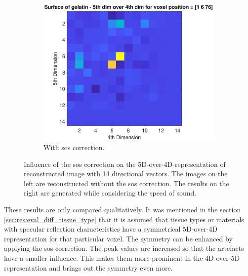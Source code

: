 \begin{figure}[H]
\begin{subfigure}[b]{0.47\textwidth}
         \label{leer}
     \end{subfigure}
          \hfill
     \begin{subfigure}[b]{0.47\textwidth}
         \centering
         \includegraphics[width=1.02\textwidth]{Graphics/Results/14_vecs_sos_vs_noSos/5thdim_over4D_with_sos_skin.eps}
         \caption{With \ac{sos} correction.}
         \label{leer}
     \end{subfigure}
        \caption{Influence of the \ac{sos} correction on the 5D-over-4D-representation of reconstructed image with 14 directional vectors. The images on the left are reconstructed without the \ac{sos} correction. The results on the right are generated while considering the speed of sound.}
        \label{fig:influence_sos_1}
\end{figure}

These results are only compared qualitatively. It was mentioned in the section \ref{sec:res:eval_diff_tissue_type} that it is assumed that tissue types or materials with specular reflection characteristics have a symmetrical 5D-over-4D representation for that particular voxel. The symmetry can be enhanced by applying the \ac{sos} correction. The peak values are increased so that the artefacts have a smaller influence. This makes them more prominent in the 4D-over-5D representation and brings out the symmetry even more. 

